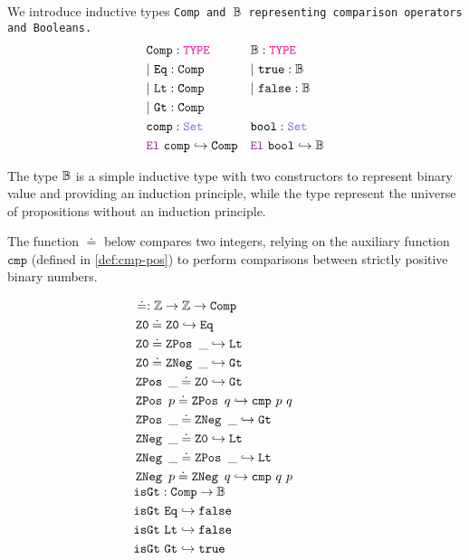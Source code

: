 \begin{definition}\label{def:arith-inequalities-def}
We introduce inductive types \tt{Comp}  and $\mathbb{B}$ representing comparison operators and Booleans.
\begin{align*}
&\tt{Comp}: \type{} & &\B: \type{} \\
&|~\tt{Eq}: \tt{Comp} & &|~\tt{true}: \B \\
&|~\tt{Lt}: \tt{Comp} & &|~\tt{false}: \B \\
&|~\tt{Gt}: \tt{Comp} & & \\
&\tt{comp}: \set & &\tt{bool}: \set  \\
&\el{}~\tt{comp} \re \tt{Comp} & &\el{}~\tt{bool} \re \B
\end{align*}

The type $\mathbb{B}$ is a simple inductive type with two constructors to represent binary value and providing an induction principle, while the type {\prop} represent the universe of propositions without an induction principle.

The function $\doteq$ below compares two integers, relying on the auxiliary function $\texttt{cmp}$ (defined in \cref{def:cmp-pos}) to perform comparisons between strictly positive binary numbers.

\[
\begin{array}[t]{l@{\hspace{4em}}l}
\begin{aligned}
&\doteq : \Z \ra \Z \ra \tt{Comp} \\
& \ZO \doteq \ZO \re \tt{Eq} \\
& \ZO \doteq \ZPos~\_ \re \tt{Lt} \\
& \ZO \doteq \ZNeg~\_ \re \tt{Gt} \\
& \ZPos~\_ \doteq \ZO \re \tt{Gt} \\
& \ZPos~p \doteq \ZPos~q \re \tt{cmp}~p~q \\
& \ZPos~\_ \doteq \ZNeg~\_ \re \tt{Gt} \\
& \ZNeg~\_ \doteq \ZO \re \tt{Lt} \\
& \ZNeg~\_ \doteq \ZPos~\_ \re \tt{Lt} \\
& \ZNeg~p \doteq \ZNeg~q \re \tt{cmp}~q~p
\end{aligned}
\\[3em]
\begin{aligned}
  &\tt{isGt} : \tt{Comp} \ra \B \\
  &\tt{isGt}~\tt{Eq} \re \tt{false} \\
  &\tt{isGt}~\tt{Lt} \re \tt{false} \\
  &\tt{isGt}~\tt{Gt} \re \tt{true}
\end{aligned}
\end{array}
\]


\end{definition}
